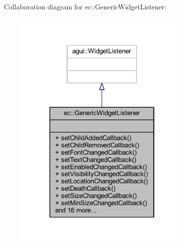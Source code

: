 Collaboration diagram for ec\+:\+:Generic\+Widget\+Listener\+:\nopagebreak
\begin{figure}[H]
\begin{center}
\leavevmode
\includegraphics[width=238pt]{classec_1_1_generic_widget_listener__coll__graph}
\end{center}
\end{figure}
